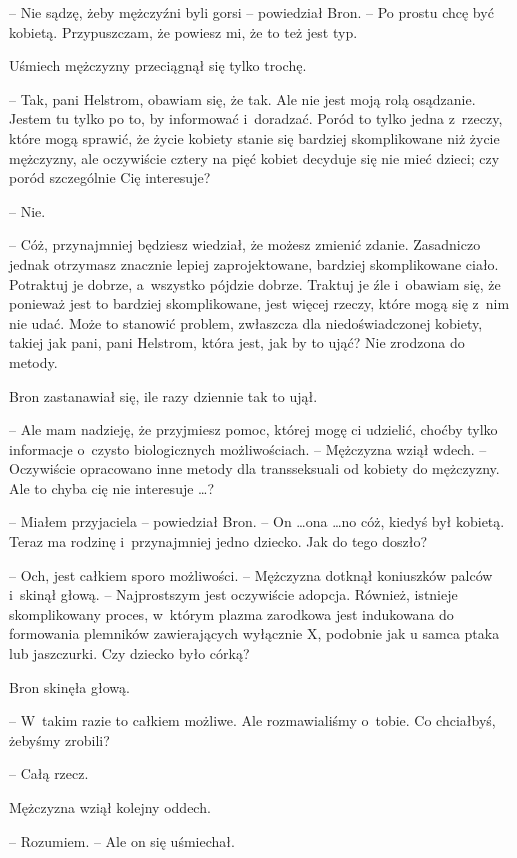 \documentclass[oneside,polish,11pt,rmheadings]{mwbk}
\begin{document}
-- Nie sądzę, żeby mężczyźni byli gorsi -- powiedział Bron. -- Po prostu chcę być kobietą. Przypuszczam, że powiesz mi, że to też jest typ. 

Uśmiech mężczyzny przeciągnął się tylko trochę. 

-- Tak, pani Helstrom, obawiam się, że tak. Ale nie jest moją rolą osądzanie. Jestem tu tylko po to, by informować i~doradzać. Poród to tylko jedna z~rzeczy, które mogą sprawić, że życie kobiety stanie się bardziej skomplikowane niż życie mężczyzny, ale oczywiście cztery na pięć kobiet decyduje się nie mieć dzieci; czy poród szczególnie Cię interesuje?

-- Nie. 

-- Cóż, przynajmniej będziesz wiedział, że możesz zmienić zdanie. Zasadniczo jednak otrzymasz znacznie lepiej zaprojektowane, bardziej skomplikowane ciało. Potraktuj je dobrze, a~wszystko pójdzie dobrze. Traktuj je źle i~obawiam się, że ponieważ jest to bardziej skomplikowane, jest więcej rzeczy, które mogą się z~nim nie udać. Może to stanowić problem, zwłaszcza dla niedoświadczonej kobiety, takiej jak pani, pani Helstrom, która jest, jak by to ująć? Nie zrodzona do metody. 

Bron zastanawiał się, ile razy dziennie tak to ujął. 

-- Ale mam nadzieję, że przyjmiesz pomoc, której mogę ci udzielić, choćby tylko informacje o~czysto biologicznych możliwościach. -- Mężczyzna wziął wdech. -- Oczywiście opracowano inne metody dla transseksuali od kobiety do mężczyzny. Ale to chyba cię nie interesuje \ldots ? 

-- Miałem przyjaciela -- powiedział Bron. -- On \ldots  ona \ldots  no cóż, kiedyś był kobietą. Teraz ma rodzinę i~przynajmniej jedno dziecko. Jak do tego doszło? 

-- Och, jest całkiem sporo możliwości. --  Mężczyzna dotknął koniuszków palców i~skinął głową. -- Najprostszym jest oczywiście adopcja. Również, istnieje skomplikowany proces, w~którym plazma zarodkowa jest indukowana do formowania plemników zawierających wyłącznie X, podobnie jak u samca ptaka lub jaszczurki. Czy dziecko było córką? 

Bron skinęła głową. 

-- W~takim razie to całkiem możliwe. Ale rozmawialiśmy o~tobie. Co chciałbyś, żebyśmy zrobili? 

-- Całą rzecz. 

Mężczyzna wziął kolejny oddech. 

-- Rozumiem. --  Ale on się uśmiechał. 
\end{document}
